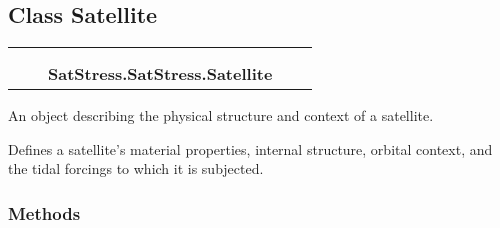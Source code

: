 
\subsection{Class Satellite}

    \label{SatStress:SatStress:Satellite}
\begin{tabular}{cccccc}
\multicolumn{2}{r}{\settowidth{\BCL}{object}\multirow{2}{\BCL}{object}}
&&
  \\\cline{3-3}
  &&\multicolumn{1}{c|}{}
&&
  \\
&&\multicolumn{2}{l}{\textbf{SatStress.SatStress.Satellite}}
\end{tabular}

An object describing the physical structure and context of a satellite.

Defines a satellite's material properties, internal structure, orbital 
context, and the tidal forcings to which it is subjected.



  \subsubsection{Methods}

    \vspace{0.5ex}

